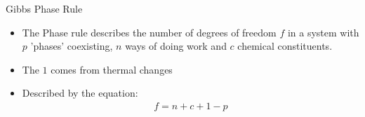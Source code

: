 \documentclass{beamer}
\begin{document}
\begin{frame}{Gibbs Phase Rule}
  \begin{itemize}
  \item The Phase rule describes the number of degrees of freedom $f$ in a system with $p$ 'phases' coexisting, $n$ ways of doing work and $c$ chemical constituents. 
  \item The $1$ comes from thermal changes
  \item Described by the equation:
    \begin{align*}
      f=n+c+1-p
    \end{align*}
  \end{itemize}
\end{frame}
\end{document}
